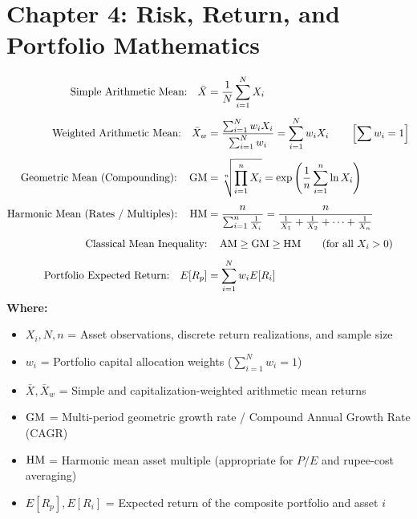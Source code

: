 \newpage
\section*{Chapter 4: Risk, Return, and Portfolio Mathematics}

\begin{formulabox}
\begin{align*}
    \text{Simple Arithmetic Mean:} \quad \bar{X} &= \frac{1}{N}\sum_{i=1}^{N} X_i \\[4pt]
    \text{Weighted Arithmetic Mean:} \quad \bar{X}_w &= \frac{\sum_{i=1}^{N} w_i X_i}{\sum_{i=1}^{N} w_i} = \sum_{i=1}^{N} w_i X_i \qquad \left[\sum w_i = 1\right] \\[4pt]
    \text{Geometric Mean (Compounding):} \quad \operatorname{GM} &= \sqrt[n]{\prod_{i=1}^{n} X_i} = \exp\left(\frac{1}{n}\sum_{i=1}^{n} \ln X_i\right) \\[4pt]
    \text{Harmonic Mean (Rates / Multiples):} \quad \operatorname{HM} &= \frac{n}{\sum_{i=1}^{n} \frac{1}{X_i}} = \frac{n}{\frac{1}{X_1} + \frac{1}{X_2} + \cdots + \frac{1}{X_n}} \\[4pt]
    \text{Classical Mean Inequality:} &\quad \operatorname{AM} \ge \operatorname{GM} \ge \operatorname{HM} \qquad (\text{for all } X_i > 0) \\[4pt]
    \text{Portfolio Expected Return:} \quad E[R_p] &= \sum_{i=1}^{N} w_i E[R_i]
\end{align*}
\textbf{Where:}
\begin{itemize}[noitemsep, topsep=2pt]
    \item $X_i, N, n$ = Asset observations, discrete return realizations, and sample size
    \item $w_i$ = Portfolio capital allocation weights ($\sum_{i=1}^N w_i = 1$)
    \item $\bar{X}, \bar{X}_w$ = Simple and capitalization-weighted arithmetic mean returns
    \item $\operatorname{GM}$ = Multi-period geometric growth rate / Compound Annual Growth Rate (CAGR)
    \item $\operatorname{HM}$ = Harmonic mean asset multiple (appropriate for $P/E$ and rupee-cost averaging)
    \item $E[R_p], E[R_i]$ = Expected return of the composite portfolio and asset $i$
\end{itemize}
\end{formulabox}

